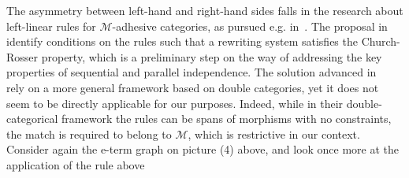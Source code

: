 \documentclass[3p]{elsarticle}
\theoremstyle{remark}
\theoremstyle{definition}
\begin{document}
The asymmetry between left-hand and right-hand sides falls in the research about left-linear rules for 
$\mathcal{M}$-adhesive categories, as pursued e.g. in~\cite{BaldanC0G24,BehrHK23}. 
The proposal in~\cite{BaldanC0G24} identify conditions on the rules such that a rewriting system 
satisfies the Church-Rosser property, which is a preliminary step on the way of 
addressing the key properties of sequential and parallel independence.
%
The solution advanced in~\cite{BehrHK23} rely on a more general framework based on
double categories, yet it does not seem to be directly applicable for our purposes. Indeed, while 
in their double-categorical framework the rules can 
be spans of morphisms with no constraints, the match is required to belong to $\mathcal{M}$, which is 
restrictive in our context. Consider again the e-term graph on picture (4) above, and look 
once more at the application of the rule above
\end{document}
